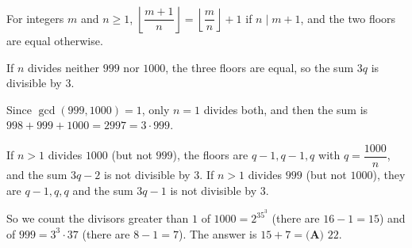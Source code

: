 For integers $m$ and $n\ge1$, $\left\lfloor\dfrac{m+1}{n}\right\rfloor=\left\lfloor\dfrac mn\right\rfloor+1$ if $n\mid m+1$, and the two floors are equal otherwise.

If $n$ divides neither $999$ nor $1000$, the three floors are equal, so the sum $3q$ is divisible by $3$.

Since $\gcd(999,1000)=1$, only $n=1$ divides both, and then the sum is $998+999+1000=2997=3\cdot999$.

If $n>1$ divides $1000$ (but not $999$), the floors are $q-1,q-1,q$ with $q=\dfrac{1000}{n}$, and the sum $3q-2$ is not divisible by $3$. If $n>1$ divides $999$ (but not $1000$), they are $q-1,q,q$ and the sum $3q-1$ is not divisible by $3$.

So we count the divisors greater than $1$ of $1000=2^35^3$ (there are $16-1=15$) and of $999=3^3\cdot37$ (there are $8-1=7$). The answer is $15+7=\boxed{\textbf{(A) }22}$.
